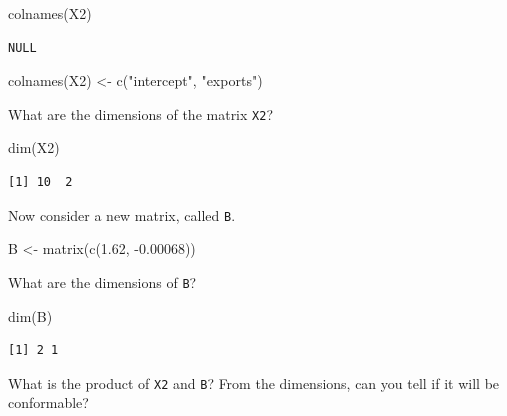 \documentclass[
  letterpaper,
]{book}
\newenvironment{Shaded}{\begin{snugshade}}{\end{snugshade}}
\newcommand{\FloatTok}[1]{\textcolor[rgb]{0.68,0.00,0.00}{#1}}
\newcommand{\FunctionTok}[1]{\textcolor[rgb]{0.28,0.35,0.67}{#1}}
\newcommand{\NormalTok}[1]{\textcolor[rgb]{0.00,0.23,0.31}{#1}}
\newcommand{\OtherTok}[1]{\textcolor[rgb]{0.00,0.23,0.31}{#1}}
\newcommand{\SpecialCharTok}[1]{\textcolor[rgb]{0.37,0.37,0.37}{#1}}
\newcommand{\StringTok}[1]{\textcolor[rgb]{0.13,0.47,0.30}{#1}}
\theoremstyle{definition}
\theoremstyle{definition}
\theoremstyle{plain}
\theoremstyle{definition}
\theoremstyle{plain}
\theoremstyle{plain}
\theoremstyle{remark}
\begin{document}
\begin{Shaded}
\begin{Highlighting}[]
\FunctionTok{colnames}\NormalTok{(X2)}
\end{Highlighting}
\end{Shaded}

\begin{verbatim}
NULL
\end{verbatim}

\begin{Shaded}
\begin{Highlighting}[]
\FunctionTok{colnames}\NormalTok{(X2) }\OtherTok{\textless{}{-}} \FunctionTok{c}\NormalTok{(}\StringTok{"intercept"}\NormalTok{, }\StringTok{"exports"}\NormalTok{)}
\end{Highlighting}
\end{Shaded}

What are the dimensions of the matrix \texttt{X2}?

\begin{Shaded}
\begin{Highlighting}[]
\FunctionTok{dim}\NormalTok{(X2)}
\end{Highlighting}
\end{Shaded}

\begin{verbatim}
[1] 10  2
\end{verbatim}

Now consider a new matrix, called \texttt{B}.

\begin{Shaded}
\begin{Highlighting}[]
\NormalTok{B }\OtherTok{\textless{}{-}} \FunctionTok{matrix}\NormalTok{(}\FunctionTok{c}\NormalTok{(}\FloatTok{1.62}\NormalTok{, }\SpecialCharTok{{-}}\FloatTok{0.00068}\NormalTok{))}
\end{Highlighting}
\end{Shaded}

What are the dimensions of \texttt{B}?

\begin{Shaded}
\begin{Highlighting}[]
\FunctionTok{dim}\NormalTok{(B)}
\end{Highlighting}
\end{Shaded}

\begin{verbatim}
[1] 2 1
\end{verbatim}

What is the product of \texttt{X2} and \texttt{B}? From the dimensions,
can you tell if it will be conformable?
\end{document}

